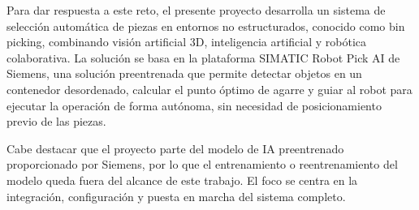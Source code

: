 Para dar respuesta a este reto, el presente proyecto desarrolla un sistema de selección automática de piezas
en entornos no estructurados, conocido como bin picking, combinando visión artificial 3D, inteligencia
artificial y robótica colaborativa. La solución se basa en la plataforma SIMATIC Robot Pick AI de Siemens,
una solución preentrenada que permite detectar objetos en un contenedor desordenado, calcular el punto óptimo
de agarre y guiar al robot para ejecutar la operación de forma autónoma, sin necesidad de posicionamiento
previo de las piezas.

Cabe destacar que el proyecto parte del modelo de IA preentrenado proporcionado por Siemens, por lo que
el entrenamiento o reentrenamiento del modelo queda fuera del alcance de este trabajo. El foco se centra
en la integración, configuración y puesta en marcha del sistema completo.
